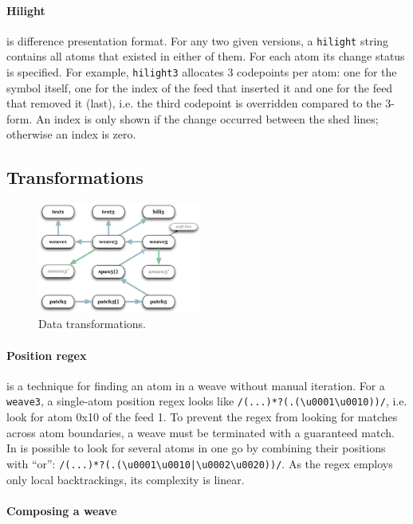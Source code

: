 \documentclass[twocolumn]{article}
\begin{document}
\paragraph{Hilight} is difference presentation format. For any two given versions, a {\tt hilight} string contains all atoms that existed in either of them. For each atom its change status is specified.  For example, {\tt hilight3} allocates 3 codepoints per atom: one for the symbol itself, one for the index of the feed that inserted it and one for the feed that removed it (last), i.e. the third codepoint is overridden compared to the 3-form. An index is only shown if the change occurred between the shed lines; otherwise an index is zero.

\subsection {Transformations}

\begin{figure} \label{fig:formats}
\includegraphics[width=0.48\textwidth]{formats.pdf}
\caption{Data transformations.}
\end{figure}

\paragraph{Position regex} is a technique for finding an atom in a weave without manual iteration. For a {\tt weave3}, a single-atom position regex looks like \verb+/(...)*?(.(\u0001\u0010))/+, i.e. look for atom 0x10 of the feed 1. To prevent the regex from looking for matches across atom boundaries, a weave must be terminated with a guaranteed match. In is possible to look for several atoms in one go by combining their positions with ``or'': \verb+/(...)*?(.(\u0001\u0010|\u0002\u0020))/+. As the regex employs only local backtrackings, its complexity is linear.

\paragraph{Composing a weave}
\end{document}
